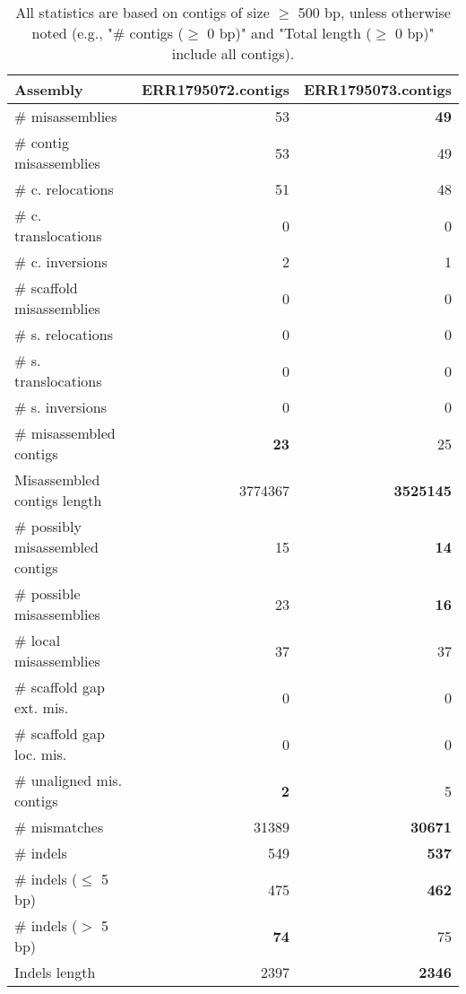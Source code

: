 \documentclass[12pt,a4paper]{article}
\begin{document}
\begin{table}[ht]
\begin{center}
\caption{All statistics are based on contigs of size $\geq$ 500 bp, unless otherwise noted (e.g., "\# contigs ($\geq$ 0 bp)" and "Total length ($\geq$ 0 bp)" include all contigs).}
\begin{tabular}{|l*{2}{|r}|}
\hline
Assembly & ERR1795072.contigs & ERR1795073.contigs \\ \hline
\# misassemblies & 53 & {\bf 49} \\ \hline
\hspace{2mm}\# contig misassemblies & 53 & 49 \\ \hline
\hspace{5mm}\# c. relocations & 51 & 48 \\ \hline
\hspace{5mm}\# c. translocations & 0 & 0 \\ \hline
\hspace{5mm}\# c. inversions & 2 & 1 \\ \hline
\hspace{2mm}\# scaffold misassemblies & 0 & 0 \\ \hline
\hspace{5mm}\# s. relocations & 0 & 0 \\ \hline
\hspace{5mm}\# s. translocations & 0 & 0 \\ \hline
\hspace{5mm}\# s. inversions & 0 & 0 \\ \hline
\# misassembled contigs & {\bf 23} & 25 \\ \hline
Misassembled contigs length & 3774367 & {\bf 3525145} \\ \hline
\# possibly misassembled contigs & 15 & {\bf 14} \\ \hline
\hspace{5mm}\# possible misassemblies & 23 & {\bf 16} \\ \hline
\# local misassemblies & 37 & 37 \\ \hline
\# scaffold gap ext. mis. & 0 & 0 \\ \hline
\# scaffold gap loc. mis. & 0 & 0 \\ \hline
\# unaligned mis. contigs & {\bf 2} & 5 \\ \hline
\# mismatches & 31389 & {\bf 30671} \\ \hline
\# indels & 549 & {\bf 537} \\ \hline
\hspace{5mm}\# indels ($\leq$ 5 bp) & 475 & {\bf 462} \\ \hline
\hspace{5mm}\# indels ($>$ 5 bp) & {\bf 74} & 75 \\ \hline
Indels length & 2397 & {\bf 2346} \\ \hline
\end{tabular}
\end{center}
\end{table}
\end{document}
